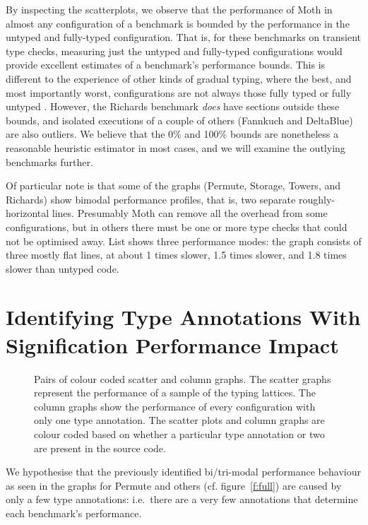 \documentclass[sigplan,screen]{acmart}
\begin{document}
By inspecting the scatterplots, we observe that the performance of
Moth in almost any configuration of a benchmark is bounded by
the performance in the untyped and fully-typed configuration.
That is, for these benchmarks on transient type checks,
measuring just the untyped and fully-typed configurations
would provide excellent estimates of a benchmark's
performance bounds.  This is different to the experience
of other kinds of gradual typing, where the best, and most
importantly worst, configurations are not always those
fully typed or fully untyped \cite{Greenman2019jfp}.
%
However, the Richards benchmark \textit{does} have
sections outside these bounds, and isolated executions of
a couple of others (Fannkuch and DeltaBlue) are also outliers.
%
We believe that the 0\% and 100\% bounds are nonetheless a
reasonable heuristic estimator in most cases, and we will
examine the outlying benchmarks further.


Of particular note is that some of the graphs (Permute, Storage, Towers, and Richards) show bimodal performance profiles, that is, two separate roughly-horizontal lines. Presumably Moth can remove all the overhead from some configurations, but in others there must be one or more type checks that could not be optimised away. List shows three performance modes: the graph consists of three mostly flat lines, at about 1 times slower, 1.5 times slower, and 1.8 times slower than untyped code.



\section{Identifying Type Annotations With Signification Performance Impact}
\label{s-individual}
\begin{figure*}
	
	\caption{Pairs of colour coded scatter and column graphs. The scatter graphs represent the performance of a sample of the typing lattices. The column graphs show the performance of every configuration with only one type annotation. The scatter plots and column graphs are colour coded based on whether a particular type annotation or two are present in the source code.}
	\label{f:pattern}		
\end{figure*}

We hypothesise that the previously identified bi/tri-modal performance behaviour
as seen in the graphs for Permute and others (cf. figure~\ref{f:full}) are caused by only a few type annotations: i.e.\ there are a very few annotations that determine each benchmark's performance.
\end{document}
